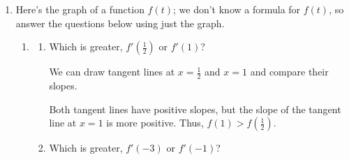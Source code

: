 \documentclass{article}
\begin{document}
\begin{enumerate}
\item  \label{derivative-function-1}

  Here's the graph of a function $f(t)$; we don't know a formula for $f(t)$, so answer the questions below using just the graph. 
  \begin{center}
  \end{center}

  \begin{enumerate}

  \item \label{derivative-function-1-qualitative}


    \begin{enumerate}
    \item
      \begin{problem}[\stretch{0.2}]
        Which is greater, $f'( \frac{1}{2})$ or $f'(1)$?
      \end{problem}

      \begin{solution}
        We can draw tangent lines at $x=\frac{1}{2}$ and $x=1$ and compare their slopes.
        \begin{center}
        \end{center}

        Both tangent lines have positive slopes, but the slope of the tangent line at $x=1$ is more positive. Thus, 
        $f(1) > f(\frac{1}{2})$. 
      \end{solution}

    \item
      \begin{problem}[\stretch{0.2}]
        Which is greater, $f' (-3)$ or $f'(-1)$?
      \end{problem}


\end{enumerate}
\end{enumerate}
\end{enumerate}
\end{document}
